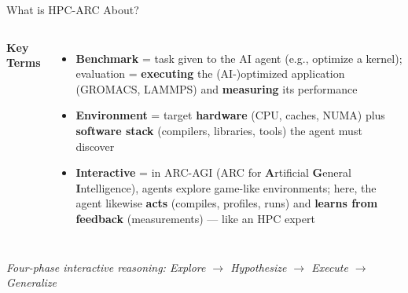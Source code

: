 \documentclass[compress,aspectratio=169]{beamer}
\begin{document}
\begin{frame}{What is HPC-ARC About?}
\begin{columns}[t]
            \textbf{Key Terms}
            \vspace{0.2em}
            \scriptsize
            \begin{itemize}
                \item \textbf{Benchmark} = task given to the AI agent (e.g., optimize a kernel); evaluation = \textbf{executing} the (AI-)optimized application (GROMACS, LAMMPS) and \textbf{measuring} its performance
                \item \textbf{Environment} = target \textbf{hardware} (CPU, caches, NUMA) plus \textbf{software stack} (compilers, libraries, tools) the agent must discover
                \item \textbf{Interactive} = in ARC-AGI (ARC for \textbf{A}rtificial \textbf{G}eneral \textbf{I}ntelligence), agents explore game-like environments; here, the agent likewise \textbf{acts} (compiles, profiles, runs) and \textbf{learns from feedback} (measurements) --- like an HPC expert
            \end{itemize}
    \end{columns}

    \vspace{0.2em}
    \centering
    \scriptsize \textit{Four-phase interactive reasoning: Explore $\to$ Hypothesize $\to$ Execute $\to$ Generalize}
\end{frame}
\end{document}
